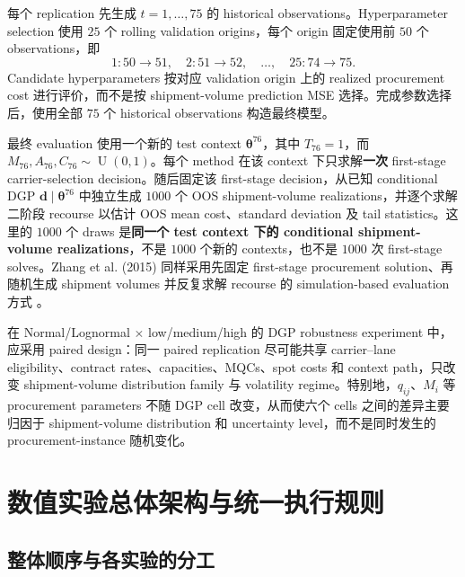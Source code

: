 \documentclass[11pt,a4paper]{ctexart}
\newcommand{\U}{\operatorname{U}}
\begin{document}
每个 replication 先生成 $t=1,\ldots,75$ 的 historical observations。Hyperparameter selection 使用 $25$ 个 rolling validation origins，每个 origin 固定使用前 $50$ 个 observations，即
\[
1{:}50\rightarrow51,\quad 2{:}51\rightarrow52,\quad \ldots,\quad 25{:}74\rightarrow75.
\]
Candidate hyperparameters 按对应 validation origin 上的 realized procurement cost 进行评价，而不是按 shipment-volume prediction MSE 选择。完成参数选择后，使用全部 $75$ 个 historical observations 构造最终模型。

最终 evaluation 使用一个新的 test context $\boldsymbol\theta^{76}$，其中 $T_{76}=1$，而 $M_{76},A_{76},C_{76}\sim\U(0,1)$。每个 method 在该 context 下只求解\textbf{一次} first-stage carrier-selection decision。随后固定该 first-stage decision，从已知 conditional DGP $\boldsymbol d\mid\boldsymbol\theta^{76}$ 中独立生成 $1000$ 个 OOS shipment-volume realizations，并逐个求解二阶段 recourse 以估计 OOS mean cost、standard deviation 及 tail statistics。这里的 $1000$ 个 draws 是\textbf{同一个 test context 下的 conditional shipment-volume realizations}，不是 $1000$ 个新的 contexts，也不是 $1000$ 次 first-stage solves。Zhang et al. (2015) 同样采用先固定 first-stage procurement solution、再随机生成 shipment volumes 并反复求解 recourse 的 simulation-based evaluation 方式 \citep{zhang2015}。

在 Normal/Lognormal $\times$ low/medium/high 的 DGP robustness experiment 中，应采用 paired design：同一 paired replication 尽可能共享 carrier--lane eligibility、contract rates、capacities、MQCs、spot costs 和 context path，只改变 shipment-volume distribution family 与 volatility regime。特别地，$q_{ij}$、$M_i$ 等 procurement parameters 不随 DGP cell 改变，从而使六个 cells 之间的差异主要归因于 shipment-volume distribution 和 uncertainty level，而不是同时发生的 procurement-instance 随机变化。


\section{数值实验总体架构与统一执行规则}

\subsection{整体顺序与各实验的分工}
\end{document}
